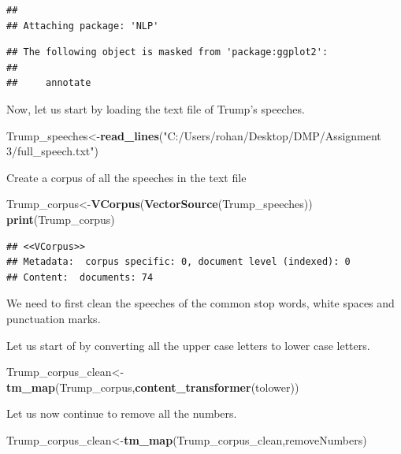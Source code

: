 \documentclass[]{article}
\newenvironment{Shaded}{\begin{snugshade}}{\end{snugshade}}
\newcommand{\KeywordTok}[1]{\textcolor[rgb]{0.13,0.29,0.53}{\textbf{#1}}}
\newcommand{\StringTok}[1]{\textcolor[rgb]{0.31,0.60,0.02}{#1}}
\newcommand{\NormalTok}[1]{#1}
\begin{document}
\begin{verbatim}
## 
## Attaching package: 'NLP'
\end{verbatim}

\begin{verbatim}
## The following object is masked from 'package:ggplot2':
## 
##     annotate
\end{verbatim}

Now, let us start by loading the text file of Trump's speeches.

\begin{Shaded}
\begin{Highlighting}[]
\NormalTok{Trump_speeches<-}\KeywordTok{read_lines}\NormalTok{(}\StringTok{"C:/Users/rohan/Desktop/DMP/Assignment 3/full_speech.txt"}\NormalTok{)}
\end{Highlighting}
\end{Shaded}

Create a corpus of all the speeches in the text file

\begin{Shaded}
\begin{Highlighting}[]
\NormalTok{Trump_corpus<-}\KeywordTok{VCorpus}\NormalTok{(}\KeywordTok{VectorSource}\NormalTok{(Trump_speeches))}
\KeywordTok{print}\NormalTok{(Trump_corpus)}
\end{Highlighting}
\end{Shaded}

\begin{verbatim}
## <<VCorpus>>
## Metadata:  corpus specific: 0, document level (indexed): 0
## Content:  documents: 74
\end{verbatim}

We need to first clean the speeches of the common stop words, white
spaces and punctuation marks.

Let us start of by converting all the upper case letters to lower case
letters.

\begin{Shaded}
\begin{Highlighting}[]
\NormalTok{Trump_corpus_clean<-}\KeywordTok{tm_map}\NormalTok{(Trump_corpus,}\KeywordTok{content_transformer}\NormalTok{(tolower))}
\end{Highlighting}
\end{Shaded}

Let us now continue to remove all the numbers.

\begin{Shaded}
\begin{Highlighting}[]
\NormalTok{Trump_corpus_clean<-}\KeywordTok{tm_map}\NormalTok{(Trump_corpus_clean,removeNumbers)}
\end{Highlighting}
\end{Shaded}
\end{document}

